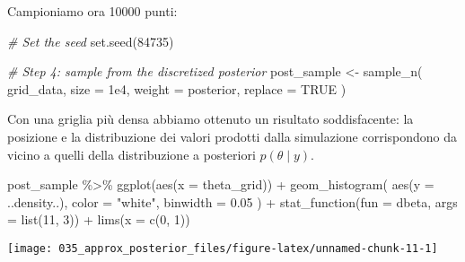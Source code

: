 \documentclass[
]{memoir}
\newenvironment{Shaded}{\begin{snugshade}}{\end{snugshade}}
\newcommand{\AttributeTok}[1]{\textcolor[rgb]{0.77,0.63,0.00}{#1}}
\newcommand{\CommentTok}[1]{\textcolor[rgb]{0.56,0.35,0.01}{\textit{#1}}}
\newcommand{\ConstantTok}[1]{\textcolor[rgb]{0.00,0.00,0.00}{#1}}
\newcommand{\DecValTok}[1]{\textcolor[rgb]{0.00,0.00,0.81}{#1}}
\newcommand{\FloatTok}[1]{\textcolor[rgb]{0.00,0.00,0.81}{#1}}
\newcommand{\FunctionTok}[1]{\textcolor[rgb]{0.00,0.00,0.00}{#1}}
\newcommand{\NormalTok}[1]{#1}
\newcommand{\OtherTok}[1]{\textcolor[rgb]{0.56,0.35,0.01}{#1}}
\newcommand{\SpecialCharTok}[1]{\textcolor[rgb]{0.00,0.00,0.00}{#1}}
\newcommand{\StringTok}[1]{\textcolor[rgb]{0.31,0.60,0.02}{#1}}
\begin{document}
\noindent
Campioniamo ora 10000 punti:

\begin{Shaded}
\begin{Highlighting}[]
\CommentTok{\# Set the seed}
\FunctionTok{set.seed}\NormalTok{(}\DecValTok{84735}\NormalTok{)}

\CommentTok{\# Step 4: sample from the discretized posterior}
\NormalTok{post\_sample }\OtherTok{\textless{}{-}} \FunctionTok{sample\_n}\NormalTok{(}
\NormalTok{  grid\_data,}
  \AttributeTok{size =} \FloatTok{1e4}\NormalTok{,}
  \AttributeTok{weight =}\NormalTok{ posterior,}
  \AttributeTok{replace =} \ConstantTok{TRUE}
\NormalTok{)}
\end{Highlighting}
\end{Shaded}

\noindent
Con una griglia più densa abbiamo ottenuto un risultato soddisfacente: la posizione e la distribuzione dei valori prodotti dalla simulazione corrispondono da vicino a quelli della distribuzione a posteriori \(p(\theta \mid y)\).

\begin{Shaded}
\begin{Highlighting}[]
\NormalTok{post\_sample }\SpecialCharTok{\%\textgreater{}\%}
  \FunctionTok{ggplot}\NormalTok{(}\FunctionTok{aes}\NormalTok{(}\AttributeTok{x =}\NormalTok{ theta\_grid)) }\SpecialCharTok{+}
  \FunctionTok{geom\_histogram}\NormalTok{(}
    \FunctionTok{aes}\NormalTok{(}\AttributeTok{y =}\NormalTok{ ..density..), }
    \AttributeTok{color =} \StringTok{"white"}\NormalTok{, }
    \AttributeTok{binwidth =} \FloatTok{0.05}
\NormalTok{  ) }\SpecialCharTok{+}
  \FunctionTok{stat\_function}\NormalTok{(}\AttributeTok{fun =}\NormalTok{ dbeta, }\AttributeTok{args =} \FunctionTok{list}\NormalTok{(}\DecValTok{11}\NormalTok{, }\DecValTok{3}\NormalTok{)) }\SpecialCharTok{+}
  \FunctionTok{lims}\NormalTok{(}\AttributeTok{x =} \FunctionTok{c}\NormalTok{(}\DecValTok{0}\NormalTok{, }\DecValTok{1}\NormalTok{))}
\end{Highlighting}
\end{Shaded}

\begin{center}\texttt{[image: 035\_approx\_posterior\_files/figure-latex/unnamed-chunk-11-1]} \end{center}
\end{document}
